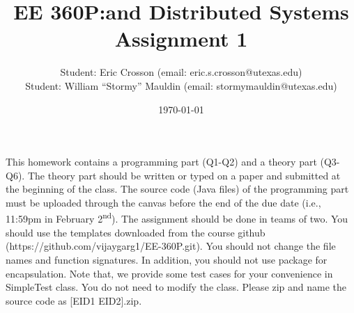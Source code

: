 \documentclass[11pt]{article}
\begin{document}
\title{EE 360P:\@Concurrent and Distributed Systems \\ Assignment 1}
\author{Student: Eric Crosson (email: eric.s.crosson@utexas.edu)\\
  Student: William ``Stormy'' Mauldin (email: stormymauldin@utexas.edu)}
\date{\today}
\maketitle

This homework contains a programming part (Q1-Q2) and a theory part (Q3-Q6). The
theory part should be written or typed on a paper and submitted at the beginning
of the class. The source code (Java files) of the programming part must be
uploaded through the canvas before the end of the due date (i.e., 11:59pm in
February 2\textsuperscript{nd}). The assignment should be done in teams of two. You
should use the templates downloaded from the course github
(https://github.com/vijaygarg1/EE-360P.git). You should not change the file
names and function signatures. In addition, you should not use package for
encapsulation. Note that, we provide some test cases for your convenience in
SimpleTest class. You do not need to modify the class. Please zip and name the
source code as [EID1 EID2].zip. \\
\end{document}
